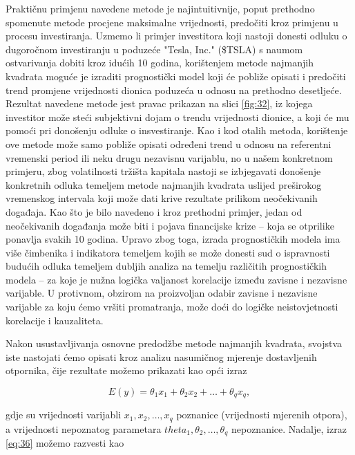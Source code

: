 \documentclass[a4paper,12pt,oneside]{memoir}
\begin{document}
                Praktičnu primjenu navedene metode je najintuitivnije, poput prethodno spomenute metode procjene maksimalne vrijednosti, predočiti kroz primjenu u procesu investiranja. Uzmemo li primjer investitora koji nastoji donesti odluku o dugoročnom investiranju u poduzeće "Tesla, Inc." (\$TSLA) s naumom ostvarivanja dobiti kroz idućih 10 godina, korištenjem metode najmanjih kvadrata moguće je izraditi prognostički model koji će pobliže opisati i predočiti trend promjene vrijednosti dionica poduzeća u odnosu na prethodno desetljeće. Rezultat navedene metode jest pravac prikazan na slici \ref{fig:32}, iz kojega investitor može steći subjektivni dojam o trendu vrijednosti dionice, a koji će mu pomoći pri donošenju odluke o insvestiranje. Kao i kod otalih metoda, korištenje ove metode može samo pobliže opisati određeni trend u odnosu na referentni vremenski period ili neku drugu nezavisnu varijablu, no u našem konkretnom primjeru, zbog volatilnosti tržišta kapitala nastoji se izbjegavati donošenje konkretnih odluka temeljem metode najmanjih kvadrata uslijed preširokog vremenskog intervala koji može dati krive rezultate prilikom neočekivanih događaja. Kao što je bilo navedeno i kroz prethodni primjer, jedan od neočekivanih događanja može biti i pojava financijske krize -- koja se otprilike ponavlja svakih 10 godina. Upravo zbog toga, izrada prognostičkih modela ima više čimbenika i indikatora temeljem kojih se može donesti sud o ispravnosti budućih odluka temeljem dubljih analiza na temelju različitih prognostičkih modela -- za koje je nužna logička valjanost korelacije između zavisne i nezavisne varijable. U protivnom, obzirom na proizvoljan odabir zavisne i nezavisne varijable za koju ćemo vršiti promatranja, može doći do logičke neistovjetnosti korelacije i kauzaliteta.

                Nakon usustavljivanja osnovne predodžbe metode najmanjih kvadrata, svojstva iste nastojati ćemo opisati kroz analizu nasumičnog mjerenje dostavljenih otpornika, čije rezultate možemo prikazati kao opći izraz

                \begin{equation}
                    E(y)=\theta_1x_1+\theta_2x_2+\ldots+\theta_qx_q,
                    \label{eq:36}
                \end{equation}

                gdje su vrijednosti varijabli $x_1,x_2,\ldots,x_q$ poznanice (vrijednosti mjerenih otpora), a vrijednosti nepoznatog parametara $theta_1,\theta_2,\ldots,\theta_q$ nepoznanice. Nadalje, izraz \eqref{eq:36} možemo razvesti kao
\end{document}
